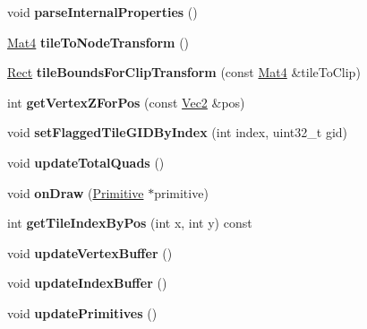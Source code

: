\begin{DoxyCompactItemize}
void {\bfseries parse\+Internal\+Properties} ()
\item 
\mbox{\label{classexperimental_1_1TMXLayer_a312df4fcfd071bf3ead4bf4b41434b52}} 
\hyperlink{classMat4}{Mat4} {\bfseries tile\+To\+Node\+Transform} ()
\item 
\mbox{\label{classexperimental_1_1TMXLayer_ab82e01b8bd35bf9bb395b48a188a2dfb}} 
\hyperlink{classRect}{Rect} {\bfseries tile\+Bounds\+For\+Clip\+Transform} (const \hyperlink{classMat4}{Mat4} \&tile\+To\+Clip)
\item 
\mbox{\label{classexperimental_1_1TMXLayer_add4e8a29cdd7ed697080b9039a36434d}} 
int {\bfseries get\+Vertex\+Z\+For\+Pos} (const \hyperlink{classVec2}{Vec2} \&pos)
\item 
\mbox{\label{classexperimental_1_1TMXLayer_a91d181863642ccf72189f9ac759f4bfa}} 
void {\bfseries set\+Flagged\+Tile\+G\+I\+D\+By\+Index} (int index, uint32\+\_\+t gid)
\item 
\mbox{\label{classexperimental_1_1TMXLayer_a056ea1fdb662723ebf0d480abfa218a2}} 
void {\bfseries update\+Total\+Quads} ()
\item 
\mbox{\label{classexperimental_1_1TMXLayer_aa71398d7609efd90319add1072745f62}} 
void {\bfseries on\+Draw} (\hyperlink{classPrimitive}{Primitive} $\ast$primitive)
\item 
\mbox{\label{classexperimental_1_1TMXLayer_a438e8cddaa688f13e525e048eebd424f}} 
int {\bfseries get\+Tile\+Index\+By\+Pos} (int x, int y) const
\item 
\mbox{\label{classexperimental_1_1TMXLayer_ab941a8bcb1a8f7e23f4ada3655c48f34}} 
void {\bfseries update\+Vertex\+Buffer} ()
\item 
\mbox{\label{classexperimental_1_1TMXLayer_ae1a0f0ae303a08992c76c1bbf2a54e0f}} 
void {\bfseries update\+Index\+Buffer} ()
\item 
\mbox{\label{classexperimental_1_1TMXLayer_a6add1f3a0c7200c124340da0b5bd55a7}} 
void {\bfseries update\+Primitives} ()
\end{DoxyCompactItemize}
